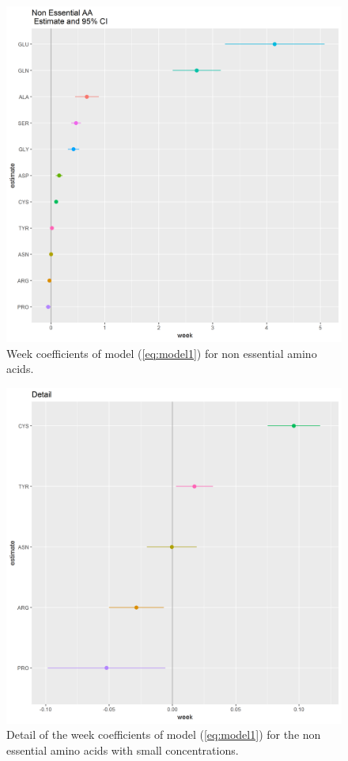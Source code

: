\documentclass[12pt]{article}
\begin{document}
\begin{figure}[!htb]
  \includegraphics[width= \textwidth]{../week/NEAA_W_coeff.png}
  \caption{Week coefficients of model (\ref{eq:model1}) for non essential amino acids.}
  \label{fig:NEAA_W_coeff}
\end{figure}

\begin{figure}[!htb]
  \includegraphics[width= \textwidth]{../week/NEAA_W_coeff_detail.png}
  \caption{Detail of the week coefficients of model (\ref{eq:model1}) for the non essential amino acids with small concentrations.}
  \label{fig:NEAA_W_coeff_detail}
\end{figure}
\end{document}

